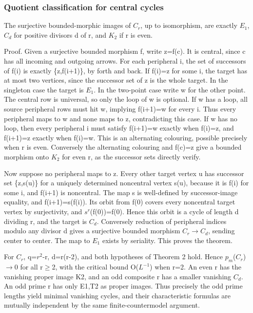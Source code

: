 \documentclass[11pt]{article}
\begin{document}
\subsubsection{Quotient classification for central cycles}

The surjective bounded-morphic images of $C_{r}$, up to isomorphism, are exactly $E_{1}$, $C_{d}$ for positive divisors d of r, and $K_{2}$ if r is even.

Proof. Given a surjective bounded morphism f, write z=f(c). It is central, since c has all incoming and outgoing arrows. For each peripheral i, the set of successors of f(i) is exactly \{z,f(i+1)\}, by forth and back. If f(i)=z for some i, the target has at most two vertices, since the successor set of z is the whole target. In the singleton case the target is $E_{1}$. In the two-point case write w for the other point. The central row is universal, so only the loop of w is optional. If w has a loop, all source peripheral rows must hit w, implying f(i+1)=w for every i. Thus every peripheral maps to w and none maps to z, contradicting this case. If w has no loop, then every peripheral i must satisfy f(i+1)=w exactly when f(i)=z, and f(i+1)=z exactly when f(i)=w. This is an alternating colouring, possible precisely when r is even. Conversely the alternating colouring and f(c)=z give a bounded morphism onto $K_{2}$ for even r, as the successor sets directly verify.

Now suppose no peripheral maps to z. Every other target vertex u has successor set \{z,s(u)\} for a uniquely determined noncentral vertex s(u), because it is f(i) for some i, and f(i+1) is noncentral. The map s is well-defined by successor-image equality, and f(i+1)=s(f(i)). Its orbit from f(0) covers every noncentral target vertex by surjectivity, and $s^{r}$(f(0))=f(0). Hence this orbit is a cycle of length d dividing r, and the target is $C_{d}$. Conversely reduction of peripheral indices modulo any divisor d gives a surjective bounded morphism $C_{r}$\ensuremath{\to}$C_{d}$, sending center to center. The map to $E_{1}$ exists by seriality. This proves the theorem.

For $C_{r}$, q=$r^{2}$-r, d=r(r-2), and both hypotheses of Theorem 2 hold. Hence $p_m$($C_{r}$)\ensuremath{\to}0 for all r\ensuremath{\geq}2, with the critical bound O($L^{-1}$) when r=2. An even r has the vanishing proper image K2, and an odd composite r has a smaller vanishing $C_{d}$. An odd prime r has only E1,T2 as proper images. Thus precisely the odd prime lengths yield minimal vanishing cycles, and their characteristic formulas are mutually independent by the same finite-countermodel argument.
\end{document}
